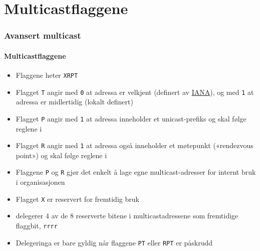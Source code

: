 \section{Multicastflaggene}
\begin{frame}%
  \frametitle{Avansert multicast}
  \framesubtitle{Multicastflaggene}
  \begin{itemize}%
  \item Flaggene heter \texttt{XRPT} 
  \item Flagget \texttt{T} angir med \texttt{0} at adressa er velkjent
    (definert av \href{http://www.iana.org/}{IANA}), og med \texttt{1}
    at adressa er midlertidig (lokalt definert)
  \item Flagget \texttt{P} angir med \texttt{1} at adressa inneholder
    et unicast-prefiks og skal følge reglene i 
  \item Flagget \texttt{R} angir med \texttt{1} at adressa også
    inneholder et møtepunkt («rendezvous point») og skal følge reglene
    i 
  \item Flaggene \texttt{P} og \texttt{R} gjør det enkelt å lage egne
    multicast-adresser for internt bruk i organisasjonen
  \item Flagget \texttt{X} er reservert for fremtidig bruk
  \item {} delegerer 4 av de 8 reserverte bitene i
    multicastadressene som fremtidige flaggbit, \texttt{rrrr}
  \item Delegeringa er bare gyldig når flaggene \texttt{PT} eller
    \texttt{RPT} er påskrudd
  \end{itemize}
\end{frame}

